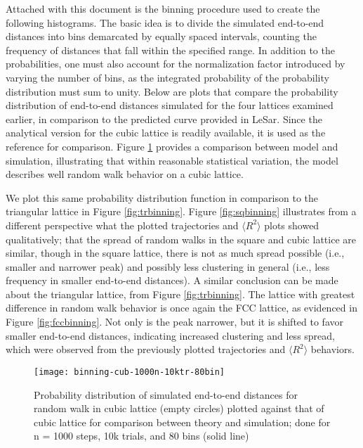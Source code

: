\documentclass[12pt, oneside]{article}
\begin{document}
Attached with this document is the binning procedure used to create the following histograms. The basic idea is to divide the simulated end-to-end distances into bins demarcated by equally spaced intervals, counting the frequency of distances that fall within the specified range. In addition to the probabilities, one must also account for the normalization factor introduced by varying the number of bins, as the integrated probability of the probability distribution must sum to unity.
Below are plots that compare the probability distribution of end-to-end distances simulated for the four lattices examined earlier, in comparison to the predicted curve provided in LeSar. Since the analytical version for the cubic lattice is readily available, it is used as the reference for comparison. Figure \ref{fig:cubbinning} provides a comparison between model and simulation, illustrating that within reasonable statistical variation, the model describes well random walk behavior on a cubic lattice.

We plot this same probability distribution function in comparison to the triangular lattice in Figure \ref{fig:trbinning}. Figure \ref{fig:sqbinning} illustrates from a different perspective what the plotted trajectories and $\langle R^2 \rangle$ plots showed qualitatively; that the spread of random walks in the square and cubic lattice are similar, though in the square lattice, there is not as much spread possible (i.e., smaller and narrower peak) and possibly less clustering in general (i.e., less frequency in smaller end-to-end distances). A similar conclusion can be made about the triangular lattice, from Figure \ref{fig:trbinning}. The lattice with greatest difference in random walk behavior is once again the FCC lattice, as evidenced in Figure \ref{fig:fccbinning}. Not only is the peak narrower, but it is shifted to favor smaller end-to-end distances, indicating increased clustering and less spread, which were observed from the previously plotted trajectories and $\langle R^2 \rangle$ behaviors.

 \begin{figure}[htbp]
    \centering
    \texttt{[image: binning-cub-1000n-10ktr-80bin]} %
    \caption{Probability distribution of simulated end-to-end distances for random walk in cubic lattice (empty circles) plotted against that of cubic lattice for comparison between theory and simulation; done for n = 1000 steps, 10k trials, and 80 bins (solid line)}
    \label{fig:cubbinning}
 \end{figure}
\end{document}
